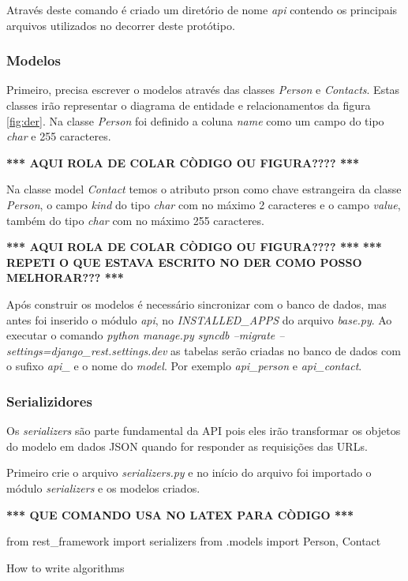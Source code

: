   Através deste comando é criado um diretório de nome \textit{api} contendo os principais arquivos utilizados no decorrer deste protótipo.

\subsubsection{Modelos}

  Primeiro, precisa escrever o modelos através das classes \textit{Person} e \textit{Contacts}. Estas classes irão representar o diagrama
  de entidade e relacionamentos da figura \ref{fig:der}. Na classe \textit{Person} foi definido a coluna \textit{name} como um campo 
  do tipo \textit{char} e 255 caracteres.
  
  \textbf{*** AQUI ROLA DE COLAR CÒDIGO OU FIGURA???? *** }
  
  Na classe model \textit{Contact} temos o atributo prson como chave estrangeira da classe \textit{Person}, o campo \textit{kind} do
  tipo \textit{char} com no máximo 2 caracteres e o campo \textit{value}, também do tipo \textit{char} com no máximo 255 caracteres.
  
  \textbf{*** AQUI ROLA DE COLAR CÒDIGO OU FIGURA???? *** }
  \textbf{*** REPETI O QUE ESTAVA ESCRITO NO DER COMO POSSO MELHORAR??? *** }
  
  Após construir os modelos é necessário sincronizar com o banco de dados, mas antes foi inserido o módulo \textit{api}, no 
  \textit{INSTALLED\_APPS} do arquivo \textit{base.py}. Ao executar o comando \textit{python manage.py syncdb --migrate --settings=django\_rest.settings.dev}
  as tabelas serão criadas no banco de dados com o sufixo \textit{api\_} e o nome do \textit{model}. Por exemplo \textit{api\_person} e \textit{api\_contact}.
  
\subsubsection{Serializidores}

  Os \textit{serializers} são parte fundamental da API pois eles irão transformar os objetos do modelo em dados \ac{JSON} quando for 
  responder as requisições das URLs.
  
  Primeiro crie o arquivo \textit{serializers.py} e no início do arquivo foi importado o módulo \textit{serializers} e os modelos
  criados.
  
  \textbf{*** QUE COMANDO USA NO LATEX PARA CÒDIGO *** }
  
  \begin{algorithm}[H]
    from rest\_framework import serializers 
    from .models import Person, Contact
  \caption{How to write algorithms}
  \end{algorithm}
  
